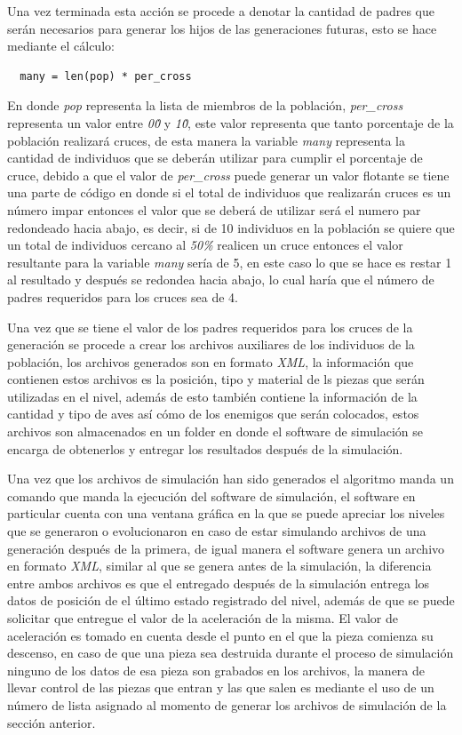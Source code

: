 Una vez terminada esta acción se procede a denotar la cantidad de padres que
serán necesarios para generar los hijos de las generaciones futuras, esto se
hace mediante el cálculo:
\begin{verbatim}
  many = len(pop) * per_cross
\end{verbatim}
En donde \textit{pop} representa la lista de miembros de la población,
\textit{per\_cross} representa un valor entre \textit{0\.0} y \textit{1\.0}, este
valor representa que tanto porcentaje de la población realizará cruces,
de esta manera la variable \textit{many} representa la cantidad de individuos
que se deberán utilizar para cumplir el porcentaje de cruce, debido a que el
valor de \textit{per\_cross} puede generar un valor flotante se tiene una parte
de código en donde si el total de individuos que realizarán cruces es un número
impar entonces el valor que se deberá de utilizar será el numero par redondeado
hacia abajo, es decir, si de 10 individuos en la población se quiere que un
total de individuos cercano al \textit{50\%} realicen un cruce entonces el valor
resultante para la variable \textit{many} sería de 5, en este caso lo que se
hace es restar 1 al resultado y después se redondea hacia abajo, lo cual haría
que el número de padres requeridos para los cruces sea de 4.

Una vez que se tiene el valor de los padres requeridos para los cruces de la
generación se procede a crear los archivos auxiliares de los individuos de la
población, los archivos generados son en formato \textit{XML}, la información
que contienen estos archivos es la posición, tipo y material de ls piezas que
serán utilizadas en el nivel, además de esto también contiene la información de
la cantidad y tipo de aves así cómo de los enemigos que serán colocados, estos
archivos son almacenados en un folder en donde el software de simulación se
encarga de obtenerlos y entregar los resultados después de la simulación.

Una vez que los archivos de simulación han sido generados el algoritmo manda un
comando que manda la ejecución del software de simulación, el software en
particular cuenta con una ventana gráfica en la que se puede apreciar los niveles
que se generaron o evolucionaron en caso de estar simulando archivos de una
generación después de la primera, de igual manera el software genera un archivo
en formato \textit{XML}, similar al que se genera antes de la simulación, la
diferencia entre ambos archivos es que el entregado después de la
simulación entrega los datos de posición de el último estado registrado del nivel,
además de que se puede solicitar que entregue el valor de la aceleración de la
misma. El valor de aceleración es tomado en cuenta desde el punto en el que la
pieza comienza su descenso, en caso de que una pieza sea destruida durante el
proceso de simulación ninguno de los datos de esa pieza son grabados en los
archivos, la manera de llevar control de las piezas que entran y las que salen
es mediante el uso de un número de lista asignado al momento de generar los
archivos de simulación de la sección anterior.

